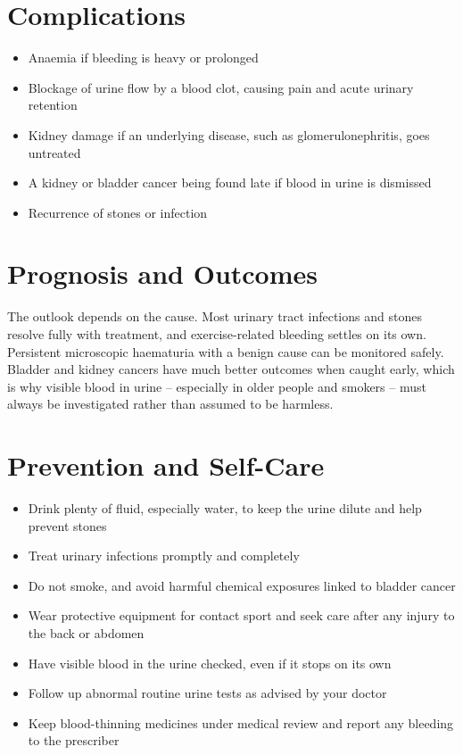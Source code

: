 \section*{Complications}
\begin{itemize}
    \item Anaemia if bleeding is heavy or prolonged
    \item Blockage of urine flow by a blood clot, causing pain and acute urinary retention
    \item Kidney damage if an underlying disease, such as glomerulonephritis, goes untreated
    \item A kidney or bladder cancer being found late if blood in urine is dismissed
    \item Recurrence of stones or infection
\end{itemize}

\section*{Prognosis and Outcomes}
The outlook depends on the cause. Most urinary tract infections and stones resolve fully with treatment, and exercise-related bleeding settles on its own. Persistent microscopic haematuria with a benign cause can be monitored safely. Bladder and kidney cancers have much better outcomes when caught early, which is why visible blood in urine -- especially in older people and smokers -- must always be investigated rather than assumed to be harmless.

\section*{Prevention and Self-Care}
\begin{itemize}
    \item Drink plenty of fluid, especially water, to keep the urine dilute and help prevent stones
    \item Treat urinary infections promptly and completely
    \item Do not smoke, and avoid harmful chemical exposures linked to bladder cancer
    \item Wear protective equipment for contact sport and seek care after any injury to the back or abdomen
    \item Have visible blood in the urine checked, even if it stops on its own
    \item Follow up abnormal routine urine tests as advised by your doctor
    \item Keep blood-thinning medicines under medical review and report any bleeding to the prescriber
\end{itemize}

